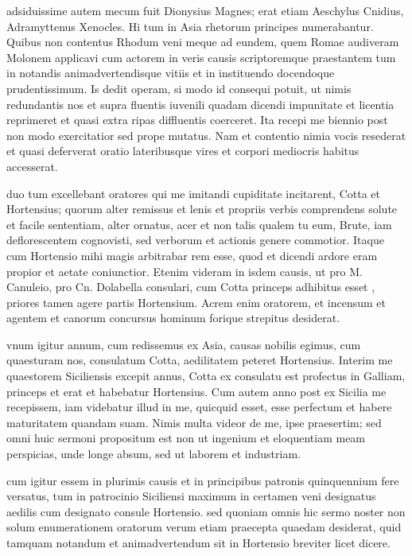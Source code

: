 adsiduissime autem mecum fuit Dionysius Magnes; erat etiam Aeschylus Cnidius, Adramyttenus Xenocles. Hi tum in Asia rhetorum principes numerabantur. Quibus non contentus Rhodum veni meque ad eundem, quem Romae audiveram Molonem applicavi cum actorem in veris causis scriptoremque praestantem tum in notandis animadvertendisque vitiis et in instituendo docendoque prudentissimum. Is dedit operam, si modo id consequi potuit, ut nimis redundantis nos et supra fluentis iuvenili quadam dicendi impunitate et licentia reprimeret et quasi extra ripas diffluentis coerceret. Ita recepi me biennio post non modo exercitatior sed prope mutatus. Nam et contentio nimia vocis resederat et quasi deferverat oratio lateribusque vires et corpori mediocris habitus accesserat.

 duo tum excellebant oratores qui me imitandi cupiditate incitarent, Cotta et Hortensius; quorum alter remissus et lenis et propriis verbis comprendens solute et facile sententiam, alter ornatus, acer et non talis qualem tu eum, Brute, iam deflorescentem cognovisti, sed verborum et actionis genere commotior. Itaque cum Hortensio mihi magis arbitrabar rem esse, quod et dicendi ardore eram propior et aetate coniunctior. Etenim videram in isdem causis, ut pro M. Canuleio, pro Cn. Dolabella consulari, cum Cotta princeps adhibitus esset , priores tamen agere partis Hortensium. Acrem enim oratorem, et incensum et agentem et canorum concursus hominum forique strepitus desiderat.

 vnum igitur annum, cum redissemus ex Asia, causas nobilis egimus, cum quaesturam nos, consulatum Cotta, aedilitatem peteret Hortensius. Interim me quaestorem Siciliensis excepit annus, Cotta ex consulatu est profectus in Galliam, princeps et erat et habebatur Hortensius. Cum autem anno post ex Sicilia me recepissem, iam videbatur illud in me, quicquid esset, esse perfectum et habere maturitatem quandam suam. Nimis multa videor de me, ipse praesertim; sed omni huic sermoni propositum est non ut ingenium et eloquentiam meam perspicias, unde longe absum, sed ut laborem et industriam.

 cum igitur essem in plurimis causis et in principibus patronis quinquennium fere versatus, tum in patrocinio Siciliensi maximum in certamen veni designatus aedilis cum designato consule Hortensio. sed quoniam omnis hic sermo noster non solum enumerationem oratorum verum etiam praecepta quaedam desiderat, quid tamquam notandum et animadvertendum sit in Hortensio breviter licet dicere.

